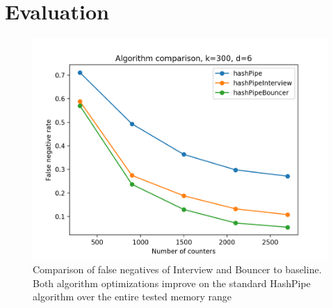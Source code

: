 \section{Evaluation}
\label{sec:eval}

\begin{figure}[t]
  \centering
    \includegraphics[scale=0.5]{algComparison}
     \caption{Comparison of false negatives of Interview and Bouncer to baseline. Both algorithm optimizations improve on the standard HashPipe algorithm over the entire tested memory range}
     \label{fig:bp-image}
\end{figure}
